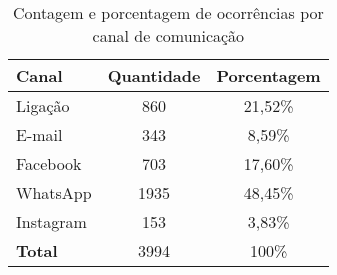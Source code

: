 \begin{table}[h]
    \centering
    \begin{tabular}{|l|c|c|}
    \hline
    \textbf{Canal}     & \textbf{Quantidade} & \textbf{Porcentagem} \\
    \hline
    Ligação     & 860  & 21,52\% \\
    E-mail       & 343  & 8,59\%  \\
    Facebook    & 703  & 17,60\% \\
    WhatsApp    & 1935 & 48,45\% \\
    Instagram   & 153  & 3,83\%  \\
    \hline
    \textbf{Total}     & 3994 & 100\% \\
    \hline
    \end{tabular}
    \caption{Contagem e porcentagem de ocorrências por canal de comunicação}
    \label{tab:contagem_ocorrencias}
\end{table}


